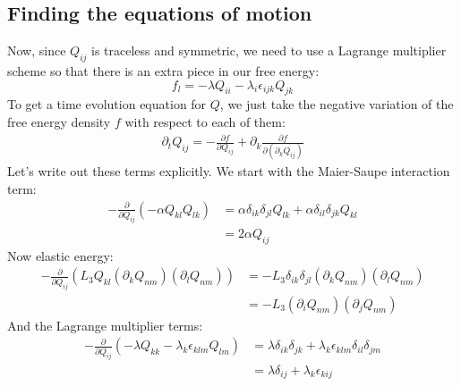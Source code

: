 \documentclass[reqno]{article}
\begin{document}
	\subsection{Finding the equations of motion}
	Now, since $Q_{ij}$ is traceless and symmetric, we need to use a Lagrange multiplier scheme so that there is an extra piece in our free energy:
	\begin{equation}
		f_l = - \lambda Q_{ii} - \lambda_i \epsilon_{ijk} Q_{jk}
	\end{equation}
	To get a time evolution equation for $Q$, we just take the negative variation of the free energy density $f$ with respect to each of them:
	\begin{equation}
	\begin{split}
		\partial_t Q_{ij} 
		= - \frac{\partial f}{\partial Q_{ij}} 
		+ \partial_k \frac{\partial f}{\partial (\partial_k Q_{ij})}
	\end{split}
	\end{equation}
	Let's write out these terms explicitly.
	We start with the Maier-Saupe interaction term:
	\begin{equation}
	\begin{split}
		-\frac{\partial}{\partial Q_{ij}} \left(-\alpha Q_{kl} Q_{lk} \right)
		&= \alpha \delta_{ik} \delta_{jl} Q_{lk}
		+ \alpha \delta_{il} \delta_{jk} Q_{kl} \\
		&= 2 \alpha Q_{ij}
	\end{split}
	\end{equation}
	Now elastic energy:
	\begin{equation}
	\begin{split}
		-\frac{\partial}{\partial Q_{ij}} \left( L_3 Q_{kl} (\partial_k Q_{nm}) (\partial_l Q_{nm}) \right)
		&= - L_3 \delta_{ik} \delta_{jl} (\partial_k Q_{nm}) (\partial_l Q_{nm}) \\
		&= -L_3 (\partial_i Q_{nm}) (\partial_j Q_{nm})
	\end{split}
	\end{equation}
	And the Lagrange multiplier terms:
	\begin{equation}
	\begin{split}
		-\frac{\partial}{\partial Q_{ij}} \left(
		- \lambda Q_{kk} - \lambda_k \epsilon_{klm} Q_{lm}
		\right)
		&= \lambda \delta_{ik} \delta_{jk}
		+ \lambda_k \epsilon_{klm} \delta_{il} \delta_{jm} \\
		&= \lambda \delta_{ij} + \lambda_k \epsilon_{kij}
	\end{split}
	\end{equation}
\end{document}
